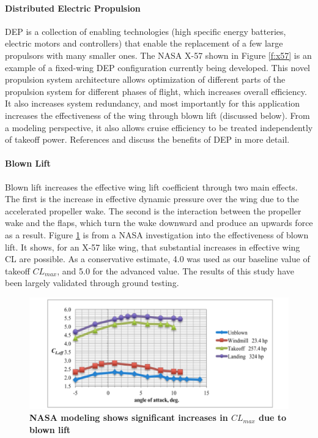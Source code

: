 \documentclass[]{aiaa-tc}%
\begin{document}
\paragraph{Distributed Electric Propulsion}
DEP is a collection of enabling technologies (high specific energy batteries, electric motors and controllers) that enable the replacement of a few large propulsors with many smaller ones.  The NASA X-57 shown in Figure \ref{f:x57} is an example of a fixed-wing DEP configuration currently being developed.   This novel propulsion system architecture allows optimization of different parts of the propulsion system for different phases of flight, which increases overall efficiency.  It also increases system redundancy, and most importantly for this application increases the effectiveness of the wing through blown lift (discussed below).  From a modeling perspective, it also allows cruise efficiency to be treated independently of takeoff power.  References \cite{StollDEP} and \cite{MooreDEP} discuss the benefits of DEP in more detail. 

\paragraph{Blown Lift}
Blown lift increases the effective wing lift coefficient through two main effects.  The first is the increase in effective dynamic pressure over the wing due to the accelerated propeller wake.  The second is the interaction between the propeller wake and the flaps, which turn the wake downward and produce an upwards force as a result\cite{MooreDEP}.  Figure \ref{f:blown_lift} is from a NASA investigation into the effectiveness of blown lift\cite{Deere}.  It shows, for an X-57 like wing, that substantial increases in effective wing CL are possible.  As a conservative estimate, 4.0 was used as our baseline value of takeoff $CL_{max}$, and 5.0 for the advanced value.  The results of this study have been largely validated through ground testing\cite{Stoll2015}. 

 \begin{figure}[!h]
 	\begin{center}
 	\includegraphics[width = 1.\textwidth]{blown_lift_chart.pdf}
     \caption{\textbf{NASA modeling shows significant increases in $CL_{max}$ due to blown lift~\cite{Deere}}}
 	\label{f:blown_lift}
 	\end{center}
 \end{figure}
 
\end{document}
